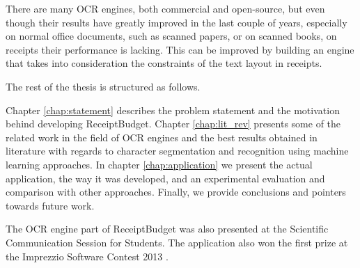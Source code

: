 There are many OCR engines, both commercial and open-source, but even though their results have greatly improved in the last couple of years, especially on normal office documents, such as scanned papers, or on scanned books, on receipts their performance is lacking. This can be improved by building an engine that takes into consideration the constraints of the text layout in receipts. 

The rest of the thesis is structured as follows.

Chapter \ref{chap:statement} describes the problem statement and the motivation behind developing ReceiptBudget. Chapter \ref{chap:lit_rev} presents some of the related work in the field of OCR engines and the best results obtained in literature with regards to character segmentation and  recognition using machine learning approaches. In chapter \ref{chap:application} we present the actual application, the way it was developed, and an experimental evaluation and comparison with other approaches. Finally, we provide conclusions and pointers towards future work. 

The OCR engine part of ReceiptBudget was also presented at the Scientific Communication Session for Students. The application also won the first prize at the Imprezzio Software Contest 2013 \cite{imprezzio}. 